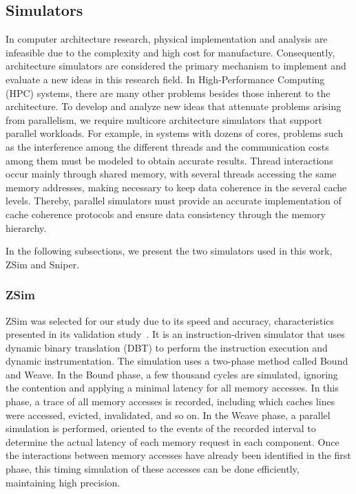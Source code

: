 \documentclass[AMA,final,STIX1COL]{WileyNJD-v2}
\begin{document}
\subsection{Simulators}

In computer architecture research, physical implementation and analysis are infeasible due to the complexity and high cost for manufacture. 
Consequently, architecture simulators are considered the primary mechanism to implement and evaluate a new ideas in this research field.
In High-Performance Computing (HPC) systems, there are many other problems besides those inherent to the architecture.
To develop and analyze new ideas that attenuate problems arising from parallelism, we require multicore architecture simulators that support parallel workloads.
For example, in systems with dozens of cores, problems such as the interference among the different threads and the communication costs among them must be modeled to obtain accurate results.
Thread interactions occur mainly through shared memory, with several threads accessing the same memory addresses, making necessary to keep data coherence in the several cache levels.
Thereby, parallel simulators must provide an accurate implementation of cache coherence protocols and ensure data consistency through the memory hierarchy.


In the following subsections, we present the two simulators used in this work, ZSim\cite{sanchez2013zsim} and Sniper\cite{carlson2014aeohmcm}.

\subsubsection{ZSim}\label{ref:subs_zsim}

ZSim was selected for our study due to its speed and accuracy, characteristics presented in its validation study~\cite{ZSim2016validation}.
It is an instruction-driven simulator that uses dynamic binary translation (DBT) to perform the instruction execution and dynamic instrumentation.
The simulation uses a two-phase method called Bound and Weave.
In the Bound phase, a few thousand cycles are simulated, ignoring the contention and applying a minimal latency for all memory accesses.
In this phase, a trace of all memory accesses is recorded, including which caches lines were accessed, evicted, invalidated, and so on.
In the Weave phase, a parallel simulation is performed, oriented to the events of the recorded interval to determine the actual latency of each memory request in each component.
Once the interactions between memory accesses have already been identified in the first phase, this timing simulation of these accesses can be done efficiently, maintaining high precision.
\end{document}
